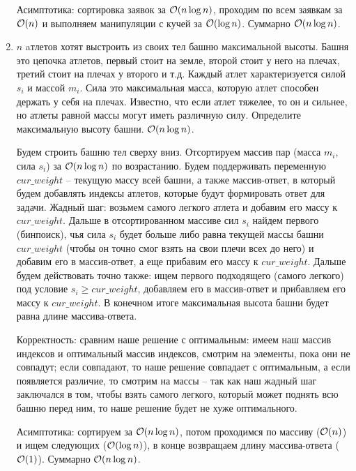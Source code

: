 \begin{enumerate}
\begin{solution}
        Асимптотика: сортировка заявок за $\mathcal{O}(n \log n)$, проходим по всем заявкам за $\mathcal{O}(n)$ и выполняем манипуляции с кучей за $\mathcal{O}(\log n)$. Суммарно $\mathcal{O}(n \log n)$.
    \end{solution}

  \item
    $n$ aтлетов хотят выстроить из своих тел башню максимальной
    высоты. Башня это цепочка атлетов, первый стоит на земле, второй
    стоит у него на плечах, третий стоит на плечах у второго и
    т.д. Каждый атлет характеризуется силой $s_i$ и массой $m_i$. Сила
    это максимальная масса, которую атлет способен держать у себя на
    плечах. Известно, что если атлет тяжелее, то он и сильнее, но
    атлеты равной массы могут иметь различную силу. Определите
    максимальную высоту башни. $\mathcal{O}(n \log n)$.

    \begin{solution}
        Будем строить башню тел сверху вниз. Отсортируем массив пар (масса $m_i$, сила $s_i$) за $\mathcal{O}(n \log n)$ по возрастанию. Будем поддерживать переменную $cur\_weight$ -- текущую массу всей башни, а также массив-ответ, в который будем добавлять индексы атлетов, которые будут формировать ответ для задачи. Жадный шаг: возьмем самого легкого атлета и добавим его массу к $cur\_weight$. Дальше в отсортированном массиве сил $s_i$ найдем первого (бинпоиск), чья сила $s_i$ будет больше либо равна текущей массы башни $cur\_weight$ (чтобы он точно смог взять на свои плечи всех до него) и добавим его в массив-ответ, а еще прибавим его массу к $cur\_weight$. Дальше будем действовать точно также: ищем первого подходящего (самого легкого) под условие $s_i \geq cur\_weight$, добавляем его в массив-ответ и прибавляем его массу к $cur\_weight$. В конечном итоге максимальная высота башни будет равна длине массива-ответа. 
        
        Корректность: сравним наше решение с оптимальным: имеем наш массив индексов и оптимальный массив индексов, смотрим на элементы, пока они не совпадут; если совпадают, то наше решение совпадает с оптимальным, а если появляется различие, то смотрим на массы -- так как наш жадный шаг заключался в том, чтобы взять самого легкого, который может поднять всю башню перед ним, то наше решение будет не хуже оптимального.

        Асимптотика: сортируем за $\mathcal{O}(n \log n)$, потом проходимся по массиву ($\mathcal{O}(n)$) и ищем следующих ($\mathcal{O}(\log n)$), в конце возвращаем длину массива-ответа ($\mathcal{O}(1)$). Суммарно $\mathcal{O}(n \log n)$.
    \end{solution}


\end{enumerate}
